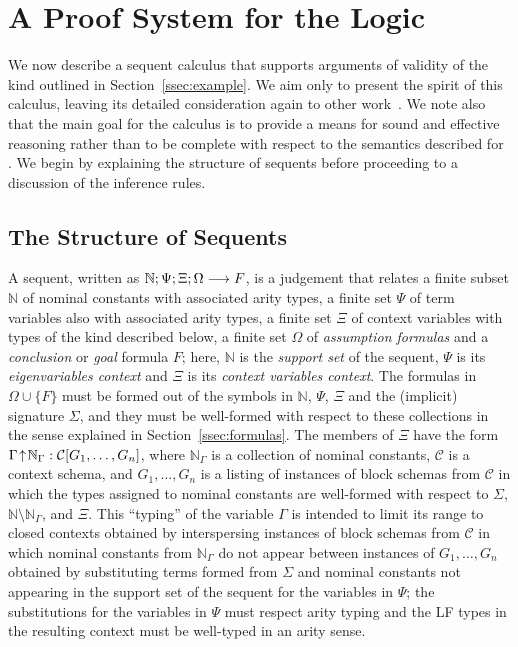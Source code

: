 \section{A Proof System for the Logic}\label{sec:proofsystem}

We now describe a sequent calculus that supports arguments of validity
of the kind outlined in Section~\ref{ssec:example}.
%
We aim only to present the spirit of this calculus, leaving
its detailed consideration again to other
work~\cite{nadathur21arxiv,southern21phd}.
%
We note also that the main goal for the calculus is to provide
a means for sound and effective reasoning rather than to be complete
with respect to the semantics described for \logic.
%
We begin by explaining the structure of sequents before proceeding to
a discussion of the inference rules.

\subsection{The Structure of Sequents}\label{ssec:sequents}

A sequent, written as $\mathbb{N};\Psi;\Xi;\Omega\longrightarrow F$, is a
judgement that relates a finite subset $\mathbb{N}$ of nominal
constants with associated arity types, a finite set $\Psi$ of term
variables also with associated arity types, a finite set $\Xi$ of
context variables with types of the kind described below, a finite set
$\Omega$ of \emph{assumption formulas} and a \emph{conclusion} or
\emph{goal} formula $F$; 
here, $\mathbb{N}$ is the \emph{support set} of the
sequent, $\Psi$ is its \emph{eigenvariables context} and $\Xi$ is its
\emph{context variables context}.
%
The formulas in $\Omega \cup \{F\}$ must be formed out of the symbols
in $\mathbb{N}$, $\Psi$, $\Xi$ and the (implicit) signature $\Sigma$,
and they must be well-formed with respect to these collections in the
sense explained in Section~\ref{ssec:formulas}. 
%
The members of $\Xi$ have the form
$\Gamma\!\uparrow\!\mathbb{N}_{\Gamma} : \mathcal{C}\lbrack {G_1,\ldots,G_n}\rbrack$,
where $\mathbb{N}_{\Gamma}$ is a collection of nominal constants,
$\mathcal{C}$ is a context schema, and $G_1,\ldots,G_n$ is a listing of
instances of block schemas from $\mathcal{C}$ in which the types assigned to
nominal constants are well-formed with respect to $\Sigma$,
$\mathbb{N} \setminus \mathbb{N}_\Gamma$, and $\Xi$. 
%
This ``typing'' of the variable $\Gamma$ is intended to limit its
range to closed contexts obtained by interspersing instances of block
schemas from $\mathcal{C}$ in which nominal constants from
$\mathbb{N}_\Gamma$ do not appear between instances of
$G_1,\ldots,G_n$ obtained by substituting terms formed from $\Sigma$
and nominal constants not appearing in the support set of the
sequent for the variables in $\Psi$; the substitutions for the
variables in $\Psi$ must respect arity typing and the LF types in the
resulting context must be well-typed in an arity sense. 

